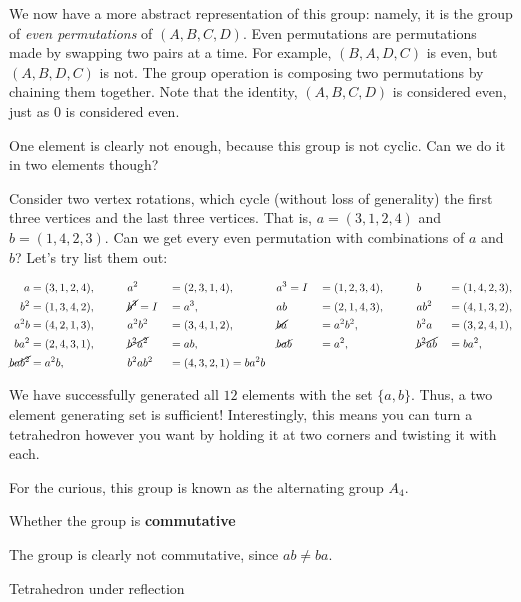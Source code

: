 \documentclass[../gatm_answers.tex]{subfiles}
\begin{document}
We now have a more abstract representation of this group: namely, it is the group of \textit{even permutations} of $(A,B,C,D)$. Even permutations are permutations made by swapping two pairs at a time. For example, $(B,A,D,C)$ is even, but $(A,B,D,C)$ is not. The group operation is composing two permutations by chaining them together. Note that the identity, $(A,B,C,D)$ is considered even, just as $0$ is considered even.

One element is clearly not enough, because this group is not cyclic. Can we do it in two elements though?

Consider two vertex rotations, which cycle (without loss of generality) the first three vertices and the last three vertices. That is, $a=(3,1,2,4)$ and $b=(1,4,2,3)$. Can we get every even permutation with combinations of $a$ and $b$? Let's try list them out:

\begin{alignat*}{9}
a &=(3,1,2,4), \qquad &&a^2&&=(2,3,1,4), \qquad &&a^3=I&&=(1,2,3,4), \qquad  &&b&&=(1,4,2,3), \\
b^2&=(1,3,4,2), &&\cancel{b^3}=I&&=a^3, &&ab&&=(2,1,4,3), &&ab^2&&=(4,1,3,2), \\
a^2b&=(4,2,1,3), &&a^2b^2&&=(3,4,1,2), &&\cancel{ba}&&=a^2b^2, &&b^2a&&=(3,2,4,1), \\
ba^2&=(2,4,3,1), &&\cancel{b^2a^2}&&=ab, &&\cancel{bab}&&=a^2, &&\cancel{b^2ab}&&=ba^2, \\
\cancel{bab^2}&=a^2b, &&b^2ab^2&&=(4,3,2,1)=ba^2b &&\\
\end{alignat*}

We have successfully generated all $12$ elements with the set $\{a,b\}$. Thus, a two element generating set is sufficient! Interestingly, this means you can turn a tetrahedron however you want by holding it at two corners and twisting it with each.

For the curious, this group is known as the alternating group $A_4$.

\begin{inner_problem}
\item Whether the group is \textbf{commutative}
\end{inner_problem}

The group is clearly not commutative, since $ab\neq ba$.

\begin{outer_problem}
\item Tetrahedron under reflection
\end{outer_problem}
\end{document}
